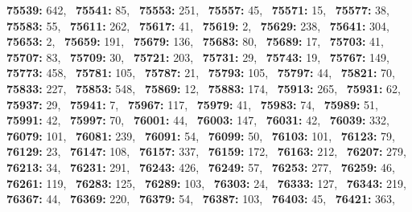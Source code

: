 \textbf{75539:} 642,\allowbreak~ 
\textbf{75541:} 85,\allowbreak~ 
\textbf{75553:} 251,\allowbreak~ 
\textbf{75557:} 45,\allowbreak~ 
\textbf{75571:} 15,\allowbreak~ 
\textbf{75577:} 38,\allowbreak~ 
\textbf{75583:} 55,\allowbreak~ 
\textbf{75611:} 262,\allowbreak~ 
\textbf{75617:} 41,\allowbreak~ 
\textbf{75619:} 2,\allowbreak~ 
\textbf{75629:} 238,\allowbreak~ 
\textbf{75641:} 304,\allowbreak~ 
\textbf{75653:} 2,\allowbreak~ 
\textbf{75659:} 191,\allowbreak~ 
\textbf{75679:} 136,\allowbreak~ 
\textbf{75683:} 80,\allowbreak~ 
\textbf{75689:} 17,\allowbreak~ 
\textbf{75703:} 41,\allowbreak~ 
\textbf{75707:} 83,\allowbreak~ 
\textbf{75709:} 30,\allowbreak~ 
\textbf{75721:} 203,\allowbreak~ 
\textbf{75731:} 29,\allowbreak~ 
\textbf{75743:} 19,\allowbreak~ 
\textbf{75767:} 149,\allowbreak~ 
\textbf{75773:} 458,\allowbreak~ 
\textbf{75781:} 105,\allowbreak~ 
\textbf{75787:} 21,\allowbreak~ 
\textbf{75793:} 105,\allowbreak~ 
\textbf{75797:} 44,\allowbreak~ 
\textbf{75821:} 70,\allowbreak~ 
\textbf{75833:} 227,\allowbreak~ 
\textbf{75853:} 548,\allowbreak~ 
\textbf{75869:} 12,\allowbreak~ 
\textbf{75883:} 174,\allowbreak~ 
\textbf{75913:} 265,\allowbreak~ 
\textbf{75931:} 62,\allowbreak~ 
\textbf{75937:} 29,\allowbreak~ 
\textbf{75941:} 7,\allowbreak~ 
\textbf{75967:} 117,\allowbreak~ 
\textbf{75979:} 41,\allowbreak~ 
\textbf{75983:} 74,\allowbreak~ 
\textbf{75989:} 51,\allowbreak~ 
\textbf{75991:} 42,\allowbreak~ 
\textbf{75997:} 70,\allowbreak~ 
\textbf{76001:} 44,\allowbreak~ 
\textbf{76003:} 147,\allowbreak~ 
\textbf{76031:} 42,\allowbreak~ 
\textbf{76039:} 332,\allowbreak~ 
\textbf{76079:} 101,\allowbreak~ 
\textbf{76081:} 239,\allowbreak~ 
\textbf{76091:} 54,\allowbreak~ 
\textbf{76099:} 50,\allowbreak~ 
\textbf{76103:} 101,\allowbreak~ 
\textbf{76123:} 79,\allowbreak~ 
\textbf{76129:} 23,\allowbreak~ 
\textbf{76147:} 108,\allowbreak~ 
\textbf{76157:} 337,\allowbreak~ 
\textbf{76159:} 172,\allowbreak~ 
\textbf{76163:} 212,\allowbreak~ 
\textbf{76207:} 279,\allowbreak~ 
\textbf{76213:} 34,\allowbreak~ 
\textbf{76231:} 291,\allowbreak~ 
\textbf{76243:} 426,\allowbreak~ 
\textbf{76249:} 57,\allowbreak~ 
\textbf{76253:} 277,\allowbreak~ 
\textbf{76259:} 46,\allowbreak~ 
\textbf{76261:} 119,\allowbreak~ 
\textbf{76283:} 125,\allowbreak~ 
\textbf{76289:} 103,\allowbreak~ 
\textbf{76303:} 24,\allowbreak~ 
\textbf{76333:} 127,\allowbreak~ 
\textbf{76343:} 219,\allowbreak~ 
\textbf{76367:} 44,\allowbreak~ 
\textbf{76369:} 220,\allowbreak~ 
\textbf{76379:} 54,\allowbreak~ 
\textbf{76387:} 103,\allowbreak~ 
\textbf{76403:} 45,\allowbreak~ 
\textbf{76421:} 363,\allowbreak~ 
